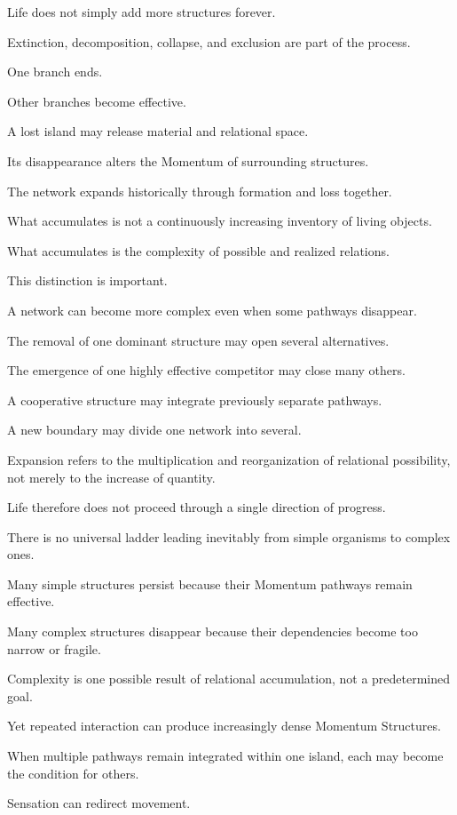 Life does not simply add more structures forever.

Extinction, decomposition, collapse, and exclusion are part of the process.

One branch ends.

Other branches become effective.

A lost island may release material and relational space.

Its disappearance alters the Momentum of surrounding structures.

The network expands historically through formation and loss together.

What accumulates is not a continuously increasing inventory of living objects.

What accumulates is the complexity of possible and realized relations.

This distinction is important.

A network can become more complex even when some pathways disappear.

The removal of one dominant structure may open several alternatives.

The emergence of one highly effective competitor may close many others.

A cooperative structure may integrate previously separate pathways.

A new boundary may divide one network into several.

Expansion refers to the multiplication and reorganization of relational possibility, not merely to the increase of quantity.

Life therefore does not proceed through a single direction of progress.

There is no universal ladder leading inevitably from simple organisms to complex ones.

Many simple structures persist because their Momentum pathways remain effective.

Many complex structures disappear because their dependencies become too narrow or fragile.

Complexity is one possible result of relational accumulation, not a predetermined goal.

Yet repeated interaction can produce increasingly dense Momentum Structures.

When multiple pathways remain integrated within one island, each may become the condition for others.

Sensation can redirect movement.

